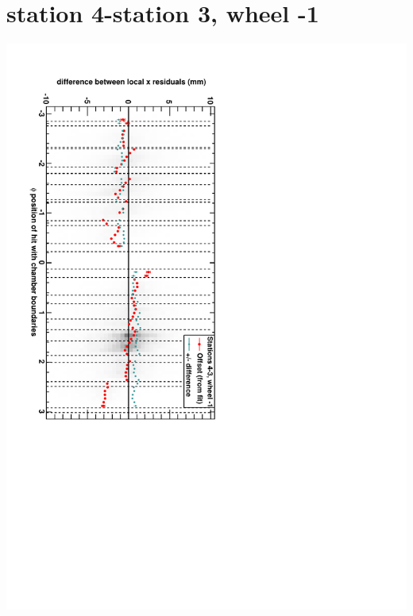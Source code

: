 \documentclass[compress]{beamer}
\begin{document}
\section*{station 4-station 3, wheel -1}
\begin{frame} \vfill \mbox{\hspace{-1 cm}\includegraphics[height=1.2\linewidth, angle=90]{DTrphidiff34VsPhi_whB_slope.pdf}} \end{frame}
\end{document}
